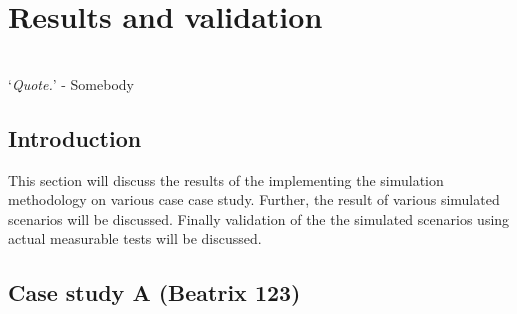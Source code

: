 \chapter{Results and validation}
\thispagestyle{empty}
\vspace{38em}
\hrulefill
\\
\enquote*{\textit{Quote.}} - Somebody\\
\newpage
\section{Introduction}
This section will discuss the results of the implementing the simulation methodology on various case case study. Further, the result of various simulated scenarios will be discussed. Finally validation of the the simulated scenarios using actual measurable tests will be discussed.
\section{Case study A \tiny{\color{blue}(Beatrix 123)}}

